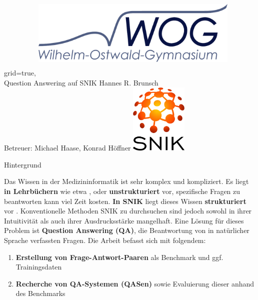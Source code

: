 \documentclass[portrait,final,a0paper,fontscale=0.320]{imiseposter}
\begin{document}
\small

\begin{poster}%
  {grid=true,}
  {\hspace{3em}\includegraphics[height=4.5cm, width=10cm, keepaspectratio]{img/logos/wog-logo-mit-text.pdf}} 
  {Question Answering auf SNIK}
  {Hannes R. Brunsch\\
  Betreuer: Michael Haase, Konrad H{\"o}ffner}
  {\includegraphics[height=9.0em]{img/logos/snik-logo.png}}

\begin{posterbox}[name=background,column=0,row=0]{Hintergrund}

Das Wissen in der Medizininformatik ist sehr komplex und kompliziert.
Es liegt \textbf{in Lehrbüchern} wie etwa \cite{bb}, \cite{ob} oder \cite{he} \textbf{unstrukturiert} vor, spezifische Fragen zu beantworten kann viel Zeit kosten.
\textbf{In SNIK} liegt dieses Wissen \textbf{strukturiert} vor \cite{snik}.
Konventionelle Methoden SNIK zu durchsuchen sind jedoch sowohl in ihrer Intuitivität als auch ihrer Ausdrucksstärke mangelhaft.
Eine Lösung für dieses Problem ist \textbf{Question Answering (QA)}, die Beantwortung von in natürlicher Sprache verfassten Fragen.
Die Arbeit befasst sich mit folgendem:
\begin{enumerate}
  \item \textbf{Erstellung von Frage-Antwort-Paaren} als Benchmark und ggf. Trainingsdaten
  \item \textbf{Recherche von QA-Systemen (QASen)} sowie Evaluierung dieser anhand des Benchmarks
\end{enumerate}


\end{posterbox}
\end{poster}
\end{document}
